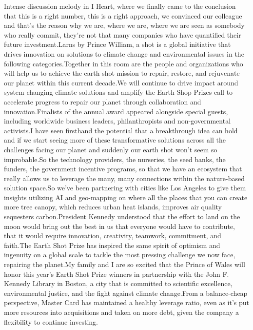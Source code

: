 \documentclass{article}%
\begin{document}
Intense discussion melody in I Heart, where we finally came to the conclusion that this is a right number, this is a right approach, we convinced our colleague and that's the reason why we are, where we are, where we are seen as somebody who really commit, they're not that many companies who have quantified their future investment.Larns by Prince William, a shot is a global initiative that drives innovation on solutions to climate change and environmental issues in the following categories.Together in this room are the people and organizations who will help us to achieve the earth shot mission to repair, restore, and rejuvenate our planet within this current decade.We will continue to drive impact around system{-}changing climate solutions and amplify the Earth Shop Prizes call to accelerate progress to repair our planet through collaboration and innovation.Finalists of the annual award appeared alongside special guests, including worldwide business leaders, philanthropists and non{-}governmental activists.I have seen firsthand the potential that a breakthrough idea can hold and if we start seeing more of these transformative solutions across all the challenges facing our planet and suddenly our earth shot won't seem so improbable.So the technology providers, the nurseries, the seed banks, the funders, the government incentive programs, so that we have an ecosystem that really allows us to leverage the many, many connections within the nature{-}based solution space.So we've been partnering with cities like Los Angeles to give them insights utilizing AI and geo{-}mapping on where all the places that you can create more tree canopy, which reduces urban heat islands, improves air quality sequesters carbon.President Kennedy understood that the effort to land on the moon would bring out the best in us that everyone would have to contribute, that it would require innovation, creativity, teamwork, commitment, and faith.The Earth Shot Prize has inspired the same spirit of optimism and ingenuity on a global scale to tackle the most pressing challenge we now face, repairing the planet.My family and I are so excited that the Prince of Wales will honor this year's Earth Shot Prize winners in partnership with the John F. Kennedy Library in Boston, a city that is committed to scientific excellence, environmental justice, and the fight against climate change.From a balance{-}cheap perspective, Master Card has maintained a healthy leverage ratio, even as it's put more resources into acquisitions and taken on more debt, given the company a flexibility to continue investing.%
\end{document}
